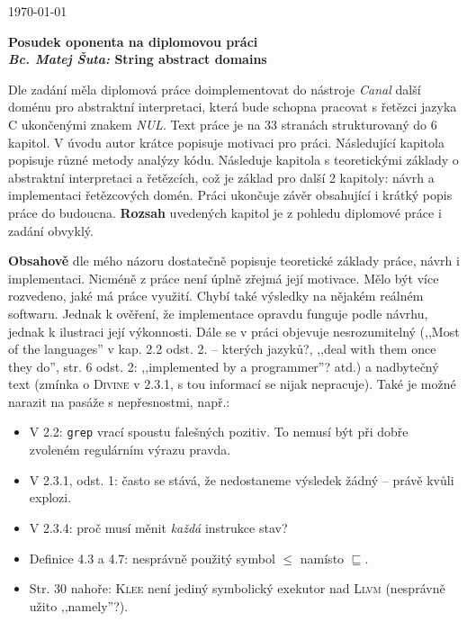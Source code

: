 \documentclass{article}
\begin{document}
\begin{flushright}
\today
\end{flushright}
\begin{center}
\Large\textbf{Posudek oponenta na diplomovou práci \\
\normalsize%
\textit{Bc. Matej Šuta:} String abstract domains}
\end{center}

Dle zadání měla diplomová práce doimplementovat do nástroje \emph{Canal}
další doménu pro abstraktní interpretaci, která bude schopna pracovat s
řetězci jazyka C ukončenými znakem \emph{NUL}. Text práce je na 33 stranách
strukturovaný do 6 kapitol. V úvodu autor krátce popisuje motivaci pro práci.
Následující kapitola popisuje různé metody analýzy kódu. Následuje kapitola s
teoretickými základy o abstraktní interpretaci a řetězcích, což je základ pro
další 2 kapitoly: návrh a implementaci řetězcových domén.  Práci ukončuje
závěr obsahující i krátký popis práce do budoucna.  \textbf{Rozsah} uvedených
kapitol je z pohledu diplomové práce i zadání obvyklý.

\textbf{Obsahově} dle mého názoru dostatečně popisuje teoretické základy
práce, návrh i implementaci. Nicméně z práce není úplně zřejmá její motivace.
Mělo být více rozvedeno, jaké má práce využití. Chybí také výsledky na nějakém
reálném softwaru. Jednak k ověření, že implementace opravdu funguje podle
návrhu, jednak k ilustraci její výkonnosti. Dále se v práci objevuje
nesrozumitelný (,,Most of the languages'' v kap. 2.2 odst. 2. -- kterých
jazyků?, ,,deal with them once they do'', str. 6 odst. 2: ,,implemented by a
programmer''? atd.) a nadbytečný text (zmínka o \textsc{Divine} v 2.3.1, s tou
informací se nijak nepracuje). Také je možné narazit na pasáže s nepřesnostmi,
např.:
\begin{itemize}
\item V 2.2: \texttt{grep} vrací spoustu falešných pozitiv. To nemusí být při
dobře zvoleném regulárním výrazu pravda.
\item V 2.3.1, odst. 1: často se stává, že nedostaneme výsledek žádný -- právě
kvůli explozi.
\item V 2.3.4: proč musí měnit \emph{každá} instrukce stav?
\item Definice 4.3 a 4.7: nesprávně použitý symbol $\leq$ namísto
$\sqsubseteq$.
\item Str. 30 nahoře: \textsc{Klee} není jediný symbolický exekutor nad
\textsc{Llvm} (nesprávně užito ,,namely''?).
\end{itemize}
\end{document}
